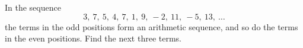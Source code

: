 In the sequence
\[3,\ 7,\ 5,\ 4,\ 7,\ 1,\ 9,\ -2,\ 11,\ -5,\ 13,\ \dots\]
the terms in the odd positions form an arithmetic sequence, and so do the terms in the even positions. Find the next three terms.
